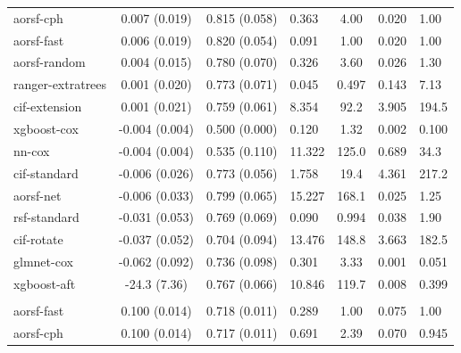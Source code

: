 \documentclass[twoside,11pt]{article}\usepackage[]{graphicx}\usepackage[]{xcolor}
\newenvironment{knitrout}{}{} %
\begin{document}
\begin{knitrout}
\begin{longtable}{lcclccl}
\hspace{1em}aorsf-cph & 0.007 (0.019) & 0.815 (0.058) & 0.363 & 4.00 & 0.020 & 1.00\\
\hspace{1em}aorsf-fast & 0.006 (0.019) & 0.820 (0.054) & 0.091 & 1.00 & 0.020 & 1.00\\
\hspace{1em}aorsf-random & 0.004 (0.015) & 0.780 (0.070) & 0.326 & 3.60 & 0.026 & 1.30\\
\hspace{1em}ranger-extratrees & 0.001 (0.020) & 0.773 (0.071) & 0.045 & 0.497 & 0.143 & 7.13\\
\hspace{1em}cif-extension & 0.001 (0.021) & 0.759 (0.061) & 8.354 & 92.2 & 3.905 & 194.5\\
\hspace{1em}xgboost-cox & -0.004 (0.004) & 0.500 (0.000) & 0.120 & 1.32 & 0.002 & 0.100\\
\hspace{1em}nn-cox & -0.004 (0.004) & 0.535 (0.110) & 11.322 & 125.0 & 0.689 & 34.3\\
\hspace{1em}cif-standard & -0.006 (0.026) & 0.773 (0.056) & 1.758 & 19.4 & 4.361 & 217.2\\
\hspace{1em}aorsf-net & -0.006 (0.033) & 0.799 (0.065) & 15.227 & 168.1 & 0.025 & 1.25\\
\hspace{1em}rsf-standard & -0.031 (0.053) & 0.769 (0.069) & 0.090 & 0.994 & 0.038 & 1.90\\
\hspace{1em}cif-rotate & -0.037 (0.052) & 0.704 (0.094) & 13.476 & 148.8 & 3.663 & 182.5\\
\hspace{1em}glmnet-cox & -0.062 (0.092) & 0.736 (0.098) & 0.301 & 3.33 & 0.001 & 0.051\\
\hspace{1em}xgboost-aft & -24.3 (7.36) & 0.767 (0.066) & 10.846 & 119.7 & 0.008 & 0.399\\
\addlinespace[0.3em]
\hline
\multicolumn{7}{l}{\textit{\textbf{Colon cancer; death, n = 929, p = 12}}}\\
\hline
\hspace{1em}aorsf-fast & 0.100 (0.014) & 0.718 (0.011) & 0.289 & 1.00 & 0.075 & 1.00\\
\hspace{1em}aorsf-cph & 0.100 (0.014) & 0.717 (0.011) & 0.691 & 2.39 & 0.070 & 0.945\\

\end{longtable}
\end{knitrout}
\end{document}
